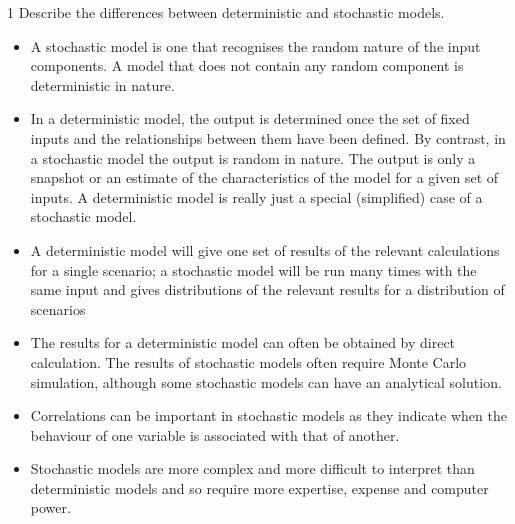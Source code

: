 \documentclass[a4paper,12pt]{article}
\begin{document}

1 Describe the differences between deterministic and stochastic models.



\begin{itemize}
\item A stochastic model is one that recognises the random nature of the input components.
A model that does not contain any random component is deterministic in nature.
\item In a deterministic model, the output is determined once the set of fixed inputs and the
relationships between them have been defined.
By contrast, in a stochastic model the output is random in nature. The output is only a
snapshot or an estimate of the characteristics of the model for a given set of inputs.
A deterministic model is really just a special (simplified) case of a stochastic model.
\item A deterministic model will give one set of results of the relevant calculations for a single
scenario; a stochastic model will be run many times with the same input and gives
distributions of the relevant results for a distribution of scenarios
\item The results for a deterministic model can often be obtained by direct calculation.
The results of stochastic models often require Monte Carlo simulation, although some
stochastic models can have an analytical solution.
\item Correlations can be important in stochastic models as they indicate when the behaviour of
one variable is associated with that of another.
\item Stochastic models are more complex and more difficult to interpret than deterministic models
and so require more expertise, expense and computer power.
\end{itemize}

\end{document}
